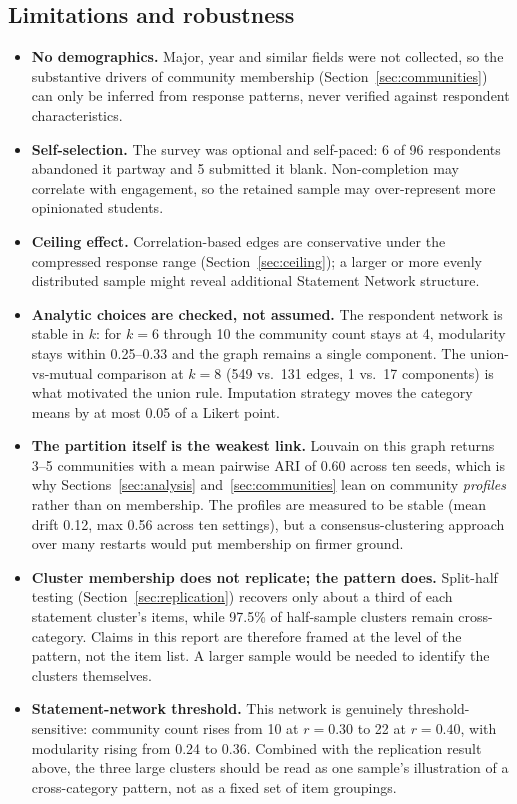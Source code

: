 \documentclass[11pt,a4paper]{article}
\begin{document}
\subsection{Limitations and robustness}\label{sec:limitations}
\begin{itemize}
\item \textbf{No demographics.} Major, year and similar fields were not collected, so the substantive drivers of community membership (Section~\ref{sec:communities}) can only be inferred from response patterns, never verified against respondent characteristics.
\item \textbf{Self-selection.} The survey was optional and self-paced: 6 of 96 respondents abandoned it partway and 5 submitted it blank. Non-completion may correlate with engagement, so the retained sample may over-represent more opinionated students.
\item \textbf{Ceiling effect.} Correlation-based edges are conservative under the compressed response range (Section~\ref{sec:ceiling}); a larger or more evenly distributed sample might reveal additional Statement Network structure.
\item \textbf{Analytic choices are checked, not assumed.} The respondent network is stable in $k$: for $k = 6$ through 10 the community count stays at 4, modularity stays within 0.25--0.33 and the graph remains a single component. The union-vs-mutual comparison at $k = 8$ (549 vs.\ 131 edges, 1 vs.\ 17 components) is what motivated the union rule. Imputation strategy moves the category means by at most 0.05 of a Likert point.
\item \textbf{The partition itself is the weakest link.} Louvain on this graph returns 3--5 communities with a mean pairwise ARI of 0.60 across ten seeds, which is why Sections~\ref{sec:analysis} and~\ref{sec:communities} lean on community \emph{profiles} rather than on membership. The profiles are measured to be stable (mean drift 0.12, max 0.56 across ten settings), but a consensus-clustering approach over many restarts would put membership on firmer ground.
\item \textbf{Cluster membership does not replicate; the pattern does.} Split-half testing (Section~\ref{sec:replication}) recovers only about a third of each statement cluster's items, while 97.5\% of half-sample clusters remain cross-category. Claims in this report are therefore framed at the level of the pattern, not the item list. A larger sample would be needed to identify the clusters themselves.
\item \textbf{Statement-network threshold.} This network is genuinely threshold-sensitive: community count rises from 10 at $r = 0.30$ to 22 at $r = 0.40$, with modularity rising from 0.24 to 0.36. Combined with the replication result above, the three large clusters should be read as one sample's illustration of a cross-category pattern, not as a fixed set of item groupings.
\end{itemize}
\end{document}
